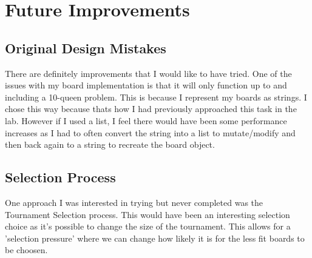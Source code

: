 \documentclass[a4paper,11pt]{article}
\begin{document}
\section*{Future Improvements}
\subsection*{Original Design Mistakes}
There are definitely improvements that I would like to have tried. One of the issues with my board implementation is that it will only function up to and including a 10-queen problem. This is because I represent my boards as strings. I chose this way because thats how I had previously approached this task in the lab. However if I used a list, I feel there would have been some performance increases as I had to often convert the string into a list to mutate/modify and then back again to a string to recreate the board object.

\subsection*{Selection Process}
One approach I was interested in trying but never completed was the Tournament Selection process. This would have been an interesting selection choice as it's possible to change the size of the tournament. This allows for a 'selection pressure' where we can change how likely it is for the less fit boards to be choosen.
\end{document}
